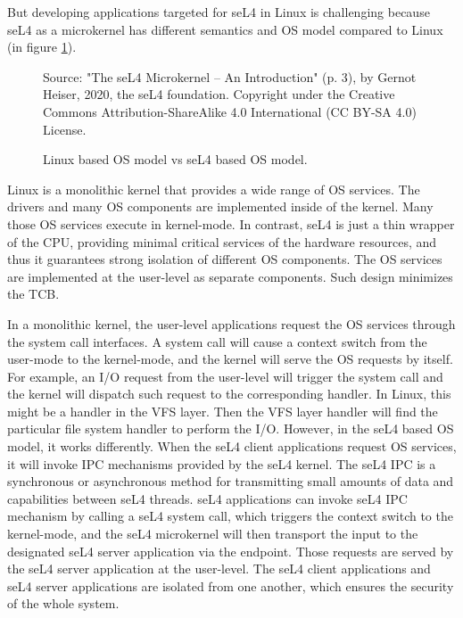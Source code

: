 But developing applications targeted for seL4 in Linux is challenging because seL4 as a microkernel has different semantics and OS model compared to Linux (in figure \ref{fig:osmodel}).

\begin{figure}[h] %
    \centering
    {Source: "The seL4 Microkernel – An Introduction" (p. 3), by Gernot Heiser, 2020, the seL4 foundation. Copyright  under the Creative Commons Attribution-ShareAlike 4.0 International (CC BY-SA 4.0) License.}
    
    \caption{Linux based OS model vs seL4 based OS model.}
    \label{fig:osmodel}
\end{figure}

Linux is a monolithic kernel that provides a wide range of OS services. The drivers and many OS components are implemented inside of the kernel. Many those OS services execute in kernel-mode. In contrast, seL4 is just a thin wrapper of the CPU, providing minimal critical services of the hardware resources, and thus it guarantees strong isolation of different OS components. The OS services are implemented at the user-level as separate components. Such design minimizes the TCB. 

In a monolithic kernel, the user-level applications request the OS services through the system call interfaces. A system call will cause a context switch from the user-mode to the kernel-mode, and the kernel will serve the OS requests by itself. For example, an I/O request from the user-level will trigger the system call and the kernel will dispatch such request to the corresponding handler. In Linux, this might be a handler in the VFS layer. Then the VFS layer handler will find the particular file system handler to perform the I/O. However, in the seL4 based OS model, it works differently. When the seL4 client applications request OS services, it will invoke IPC mechanisms provided by the seL4 kernel. The seL4 IPC is a synchronous or asynchronous method for transmitting small amounts of data and capabilities between seL4 threads. seL4 applications can invoke seL4 IPC mechanism by calling a seL4 system call, which triggers the context switch to the kernel-mode, and the seL4 microkernel will then transport the input to the designated seL4 server application via the endpoint. Those requests are served by the seL4 server application at the user-level. The seL4 client applications and seL4 server applications are isolated from one another, which ensures the security of the whole system.


